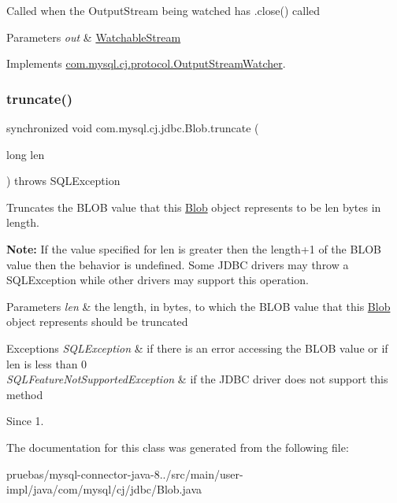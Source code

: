 Called when the Output\+Stream being watched has .close() called


\begin{DoxyParams}{Parameters}
{\em out} & \mbox{\hyperlink{}{Watchable\+Stream}} \\
\hline
\end{DoxyParams}


Implements \mbox{\hyperlink{interfacecom_1_1mysql_1_1cj_1_1protocol_1_1_output_stream_watcher_ab830e1917ebb2d14757c5fd1f5dc35ab}{com.\+mysql.\+cj.\+protocol.\+Output\+Stream\+Watcher}}.

\mbox{\label{classcom_1_1mysql_1_1cj_1_1jdbc_1_1_blob_a423c316889dc06f59cbaee6f77c6401f}} 
\subsubsection{\texorpdfstring{truncate()}{truncate()}}
{\footnotesize\ttfamily synchronized void com.\+mysql.\+cj.\+jdbc.\+Blob.\+truncate (\begin{DoxyParamCaption}\item[{long}]{len }\end{DoxyParamCaption}) throws S\+Q\+L\+Exception}

Truncates the {\ttfamily B\+L\+OB} value that this {\ttfamily \mbox{\hyperlink{classcom_1_1mysql_1_1cj_1_1jdbc_1_1_blob}{Blob}}} object represents to be {\ttfamily len} bytes in length. 

{\bfseries Note\+:} If the value specified for {\ttfamily len} is greater then the length+1 of the {\ttfamily B\+L\+OB} value then the behavior is undefined. Some J\+D\+BC drivers may throw a {\ttfamily S\+Q\+L\+Exception} while other drivers may support this operation.


\begin{DoxyParams}{Parameters}
{\em len} & the length, in bytes, to which the {\ttfamily B\+L\+OB} value that this {\ttfamily \mbox{\hyperlink{classcom_1_1mysql_1_1cj_1_1jdbc_1_1_blob}{Blob}}} object represents should be truncated \\
\hline
\end{DoxyParams}

\begin{DoxyExceptions}{Exceptions}
{\em S\+Q\+L\+Exception} & if there is an error accessing the {\ttfamily B\+L\+OB} value or if len is less than 0 \\
\hline
{\em S\+Q\+L\+Feature\+Not\+Supported\+Exception} & if the J\+D\+BC driver does not support this method \\
\hline
\end{DoxyExceptions}
\begin{DoxySince}{Since}
1. 
\end{DoxySince}


The documentation for this class was generated from the following file\+:\begin{DoxyCompactItemize}
\item 
pruebas/mysql-\/connector-\/java-\/8../src/main/user-\/impl/java/com/mysql/cj/jdbc/Blob.\+java\end{DoxyCompactItemize}
